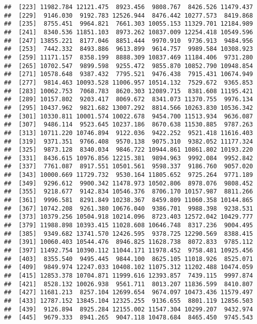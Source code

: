 \documentclass[]{article}
\begin{document}
\begin{verbatim}
##  [223] 11982.784 12121.475  8923.456  9808.767  8426.526 11479.437
##  [229]  9146.030  9192.783 12526.944  8476.442 10277.573  8419.868
##  [235]  8755.451  9964.821  7661.303 10055.153 11329.701 12184.989
##  [241]  8340.536 11851.103  8973.262 10837.009 12254.418 10549.596
##  [247] 13855.221  8177.046  8851.444  9970.910  9736.913  9484.956
##  [253]  7442.332  8493.886  9613.899  9614.757  9989.584 10308.923
##  [259] 11171.157  8358.199  8888.309 10837.469 11184.406  9731.280
##  [265] 10702.547  9899.598  9255.472  9855.870 10852.790 10948.854
##  [271] 10578.648  9387.432  7795.521  9476.438  7915.431 10674.949
##  [277]  9814.463 10093.528 11006.957 10514.132  7529.672  9365.853
##  [283] 10062.753  7068.783  8620.303 12089.715  8381.608 11195.421
##  [289] 10157.802  9203.417  8069.672  8341.073 11370.755  9976.134
##  [295] 10437.962  9821.682 13007.292  8814.566 10263.830 10536.342
##  [301] 10330.811 10001.574 10022.678  9454.700 11513.934  9636.087
##  [307]  9486.114  9523.645 10237.186  8670.638 11530.885  9787.263
##  [313] 10711.220 10746.894  9122.036  9422.252  9521.418 11616.403
##  [319]  9371.351  9766.408  9570.138  9075.310  9382.052 11177.324
##  [325]  9873.128  8340.034  9846.722 10944.861 10861.802 10193.220
##  [331]  8436.615 10976.856 12215.381  9894.963  9992.084  9952.842
##  [337]  7761.087  8917.551 10501.561  9598.337  9186.760  9057.020
##  [343] 10000.669 11729.732  9530.164 11805.652  9725.264  9771.189
##  [349]  9296.612  9900.342 11478.973 10502.806  8978.076  9808.452
##  [355]  9218.677  9142.834 10546.376  8706.170 10157.987  8811.266
##  [361]  9996.581  8291.849 10238.367  8459.809 11060.358 10144.865
##  [367] 10742.208  9261.380 10676.040  9386.701  9988.398  9238.531
##  [373] 10379.256 10504.918 10214.096  8723.403 12572.042 10429.777
##  [379] 11988.898 10393.415 11028.608 10646.748  8317.236  9004.495
##  [385]  9349.682 13741.570 12426.595  9378.725 12290.569  8388.415
##  [391] 10060.403 10544.476  8946.825 11628.738  8072.833  9785.112
##  [397] 11492.754 10390.112 11044.171 11978.452  9758.481 10925.456
##  [403]  8355.540  9495.445  9844.100  8625.105 11018.926  8525.071
##  [409]  9849.974 12247.033 10408.102 11075.312 11202.488 10474.059
##  [415] 12853.378 10704.871 11999.616 12393.857  7439.115  9997.874
##  [421]  8528.132 10026.938  9561.711  8013.207 11836.599  8410.807
##  [427] 11681.213  8257.104 12699.654  9674.097 10473.436 11579.497
##  [433] 12787.152 13845.104 12325.255  9136.655  8801.119 12856.503
##  [439]  9126.894  8925.284 12155.002 11547.304 10299.207  9432.974
##  [445]  9679.333  8941.265  9047.118 10478.684  8465.450  9745.543

\end{verbatim}
\end{document}
